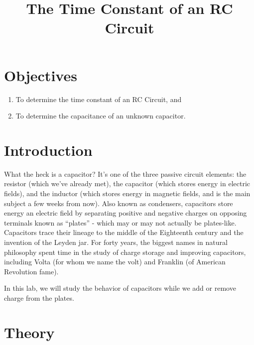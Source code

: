 \documentclass[12pt]{article}
\title{The Time Constant of an RC Circuit}
\author{}
\date{}
\begin{document}
\maketitle

\section{Objectives}
\label{sec:objectives}

\begin{enumerate}
\item To determine the time constant of an RC Circuit, and
\item To determine the capacitance of an unknown capacitor.
\end{enumerate}

\section{Introduction}
\label{sec:introduction}

What the heck is a capacitor?  It's one of the three passive circuit
elements: the resistor (which we've already met), the capacitor (which
stores energy in electric fields), and the inductor (which stores
energy in magnetic fields, and is the main subject a few weeks from
now).  Also known as condensers, capacitors store energy an electric
field by separating positive and negative charges on opposing
terminals known as ``plates'' - which may or may not actually be
plates-like.  Capacitors trace their lineage to the middle of the
Eighteenth century and the invention of the Leyden jar.  For forty
years, the biggest names in natural philosophy spent time in the study
of charge storage and improving capacitors, including Volta (for whom
we name the volt) and Franklin (of American Revolution fame).

In this lab, we will study the behavior of capacitors while we add or
remove charge from the plates.

\section{Theory}
\label{sec:theory}
\end{document}
